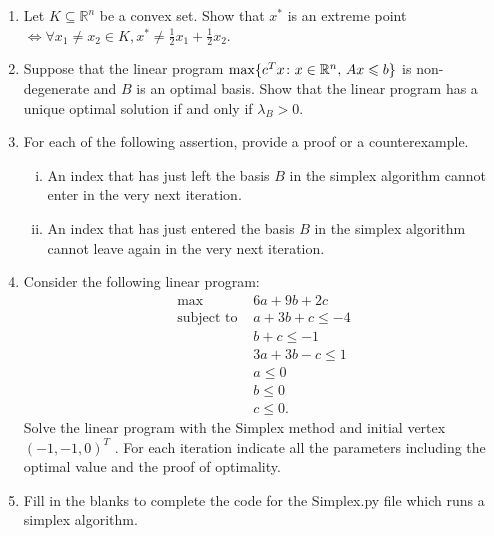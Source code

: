 \documentclass[11pt]{article}
\institute{\'Ecole Polytechnique F\'ed\'erale de Lausanne}
\newcommand{\setR}{\mathbb{R}}
\renewcommand{\leq}{\leqslant}
\begin{document}
\makeheader

\begin{enumerate}[1)]
\item Let $K \subseteq \setR^n$ be a convex set. Show that $x^\ast$ is an extreme point $\iff \forall x_1 \neq x_2 \in K, x^\ast \neq \frac{1}{2}x_1 + \frac{1}{2}x_2$. 


\item Suppose that the linear program $\max \{c^Tx \colon x \in \R^n, \, Ax \leq b\}$ is non-degenerate and $B$ is an optimal basis. Show that the linear program has a unique optimal solution if and only if $\lambda_B>0$. 


\item For each of the following assertion, provide a proof or a counterexample. 
  \begin{enumerate}[i)]
  \item An index that has just left the basis $B$ in the simplex
    algorithm cannot enter in the very next iteration.
  \item An index that has just entered the basis $B$ in the simplex
    algorithm cannot leave again in the very next iteration. 
  \end{enumerate}
  
  
\item Consider the following linear program:
\begin{align*}
\max  \quad & 6a+ 9b+ 2c \\
\text{subject to } & a+ 3b+ c ≤−4 \\
&b+ c ≤−1 \\
& 3a+ 3b−c ≤1 \\
& a ≤0  \\
& b ≤0 \\
& c ≤0. 
\end{align*}
Solve the linear program with the Simplex method and initial vertex $(−1,−1,0)^T$ . For each iteration indicate all the parameters including the optimal value and the proof of optimality.
  
 \item Fill in the blanks to complete the code for the Simplex.py file which runs a simplex algorithm. 




\end{enumerate}



  
\end{document}
